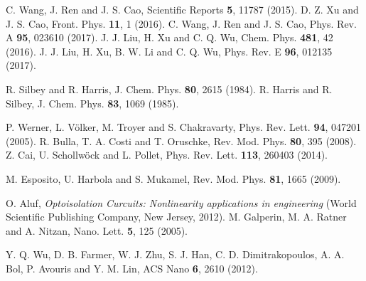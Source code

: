 \documentclass[twocolumn,preprintnumbers,amsmath,amssymb]{revtex4}
\begin{document}
\begin{thebibliography}{99}
 C. Wang, J. Ren and J. S. Cao, Scientific Reports \textbf{5}, 11787 (2015).
 D. Z. Xu and J. S. Cao, Front. Phys. \textbf{11}, 1 (2016).
  C. Wang, J. Ren and J. S. Cao, Phys. Rev. A \textbf{95}, 023610 (2017).
 J. J. Liu, H. Xu and C. Q. Wu, Chem. Phys. \textbf{481}, 42 (2016).
 J. J. Liu, H. Xu, B. W. Li and C. Q. Wu, Phys. Rev. E \textbf{96}, 012135 (2017).


 R. Silbey and R. Harris, J. Chem. Phys. \textbf{80}, 2615 (1984).
 R. Harris and R. Silbey, J. Chem. Phys. \textbf{83}, 1069 (1985).



 P. Werner, L. V\"{o}lker, M. Troyer and S. Chakravarty, Phys. Rev. Lett. \textbf{94}, 047201 (2005).
 R. Bulla, T. A. Costi and T. Oruschke, Rev. Mod. Phys. \textbf{80}, 395 (2008).
 Z. Cai, U. Schollw\"{o}ck and L. Pollet, Phys. Rev. Lett. \textbf{113}, 260403 (2014).

 M. Esposito, U. Harbola and S. Mukamel, Rev. Mod. Phys. \textbf{81}, 1665 (2009).

 O. Aluf, \emph{Optoisolation Curcuits: Nonlinearity applications in engineering} (World Scientific Publishing Company, New Jersey, 2012).
 M. Galperin, M. A. Ratner and A. Nitzan, Nano. Lett. \textbf{5}, 125 (2005).


 Y. Q. Wu, D. B. Farmer, W. J. Zhu, S. J. Han, C. D. Dimitrakopoulos, A. A. Bol, P. Avouris and Y. M. Lin,
ACS Nano \textbf{6}, 2610 (2012).






\end{thebibliography}
\end{document}
